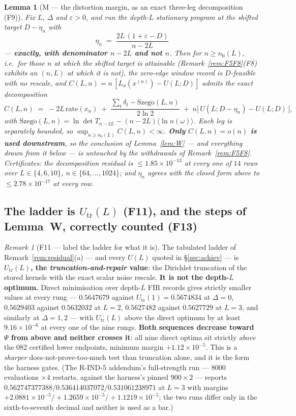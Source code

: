 \documentclass[11pt]{article}
\newtheorem{lemma}{Lemma}
\theoremstyle{definition}
\theoremstyle{remark}
\newtheorem{remark}{Remark}
\begin{document}
\begin{lemma}[M --- the distortion margin, as an exact three-leg
decomposition (F9)]
\label{lem:M}
Fix $L$, $\Delta$ and $\varepsilon>0$, and run the depth-$L$ stationary
program at the shifted target $D-\eta_n$ with
\[
\boxed{\;\eta_n\;=\;\frac{2L\,(1+\varepsilon-D)}{n-2L}\;}
\]
--- \textbf{exactly, with denominator $n-2L$ and not $n$}. Then for
$n\ge n_0(L)$, i.e.\ for those $n$ at which the shifted target is attainable
(Remark~\ref{rem:F5F8}(F8) exhibits an $(n,L)$ at which it is not), the
zero-edge window record is $D$-feasible with no rescale, and
$C(L,n)=n\,[L_a(x^{(n)})-U(L;D)]$ admits the \emph{exact} decomposition
\[
C(L,n)\;=\;-2L\,\mathrm{rate}(x_n)
\;+\;\frac{\sum_t\delta_t-\mathrm{Szeg\ddot o}(L,n)}{2\ln2}
\;+\;n\bigl[\,U(L;D-\eta_n)-U(L;D)\,\bigr],
\]
with $\mathrm{Szeg\ddot o}(L,n)=\ln\det T_{n-2L}-(n-2L)\langle\ln
n(\omega)\rangle$. Each leg is separately bounded, so
$\sup_{n\ge n_0(L)}C(L,n)<\infty$.
\textbf{Only $C(L,n)=o(n)$ is used downstream}, so the conclusion of
Lemma~\ref{lem:W} --- and everything drawn from it below --- is untouched by
the withdrawals of Remark~\ref{rem:F5F8}.
\emph{Certificates:} the decomposition residual is
$\le1.85\times10^{-13}$ at every one of $14$ rows over
$L\in\{4,6,10\}$, $n\in\{64,\dots,1024\}$; and $\eta_n$ agrees with the closed
form above to $\le2.78\times10^{-17}$ at every row.
\end{lemma}

\subsection{The ladder is $U_{\mathrm{tr}}(L)$ (F11), and the steps of
Lemma~W, correctly counted (F13)}

\begin{remark}[F11 --- label the ladder for what it is]
\label{rem:F11}
The tabulated ladder of Remark~\ref{rem:residual}(a) --- and every $U(L)$
quoted in \S\ref{sec:achiev} --- is
\textbf{$U_{\mathrm{tr}}(L)$, the \emph{truncation-and-repair} value}: the
Dirichlet truncation of the stored kernels with the exact scalar noise
rescale. \textbf{It is not the depth-$L$ optimum.} Direct minimisation over
depth-$L$ FIR records gives strictly smaller values at every rung ---
$0.5647679$ against $U_{\mathrm{tr}}(1)=0.5674834$ at $\Delta=0$,
$0.5629403$ against $0.5632032$ at $L=2$, $0.5627482$ against $0.5627729$ at
$L=3$, and similarly at $\Delta=1,2$ --- with $U_{\mathrm{tr}}(L)$ above the
direct optimum by at least $9.16\times10^{-6}$ at every one of the nine rungs.
\textbf{Both sequences decrease toward $\Psi$ from above and neither crosses
it}: all nine direct optima sit strictly \emph{above} the 082 certified lower
endpoints, minimum margin $+1.12\times10^{-5}$. This is a \emph{sharper}
does-not-prove-too-much test than truncation alone, and it is the form the
harness gates. (The R-IND-5 addendum's full-strength run --- $8000$ evaluations
$\times4$ restarts, against the harness's pinned $900\times2$ --- reports
$0.562747377388/0.536414037072/0.531061238971$ at $L=3$ with margins
$+2.0881\times10^{-5}/+1.2659\times10^{-5}/+1.1219\times10^{-5}$; the two runs
differ only in the sixth-to-seventh decimal and neither is used as a bar.)
\end{remark}
\end{document}
